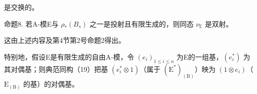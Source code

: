 是交换的。

命题8. 若A-模E与 \(\rho_{*}(B_{s})\) 之一是投射且有限生成的，则同态 \(\nu_{\mathbb{E}}\) 是双射。

这由上述内容及第4节第2号命题2得出。

特别地，假设E是有限生成的自由A-模，令 \((e_{i})_{1\leqslant i\leqslant n}\) 为E的一组基，\((e_{i}^{*})\) 为其对偶基；则典范同构（19）把基 \((e_{i}^{*}\otimes1)\)（属于 \((\mathrm{E}^{*})_{(\mathrm{B})}\)）映为 \((1\otimes e_{i})\)（\(\mathrm{E}_{(\mathrm{B})}\) 的基）的对偶基。

